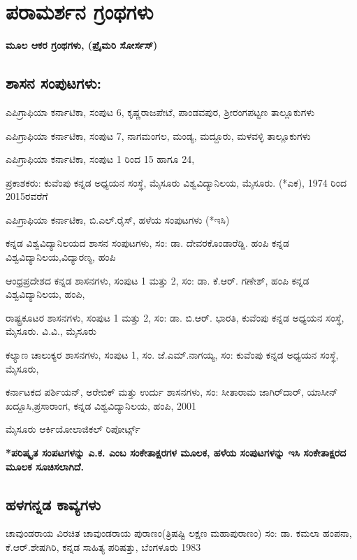 
\chapter*{ಪರಾಮರ್ಶನ ಗ್ರಂಥಗಳು}

\begin{center}
\textbf{ಮೂಲ ಆಕರ ಗ್ರಂಥಗಳು, (ಪ್ರೈಮರಿ ಸೋರ್ಸಸ್​)}
\end{center}


\section{ಶಾಸನ ಸಂಪುಟಗಳು:}

\noindent
ಎಪಿಗ್ರಾಫಿಯಾ ಕರ್ನಾಟಿಕಾ, ಸಂಪುಟ 6, ಕೃಷ್ಣರಾಜಪೇಟೆ, ಪಾಂಡವಪುರ, ಶ‍್ರೀರಂಗಪಟ್ಟಣ ತಾಲ್ಲೂಕುಗಳು 

\noindent
ಎಪಿಗ್ರಾಫಿಯಾ ಕರ್ನಾಟಿಕಾ, ಸಂಪುಟ 7, ನಾಗಮಂಗಲ, ಮಂಡ್ಯ, ಮದ್ದೂರು, ಮಳವಳ್ಳಿ ತಾಲ್ಲೂಕುಗಳು

\noindent
ಎಪಿಗ್ರಾಫಿಯಾ ಕರ್ನಾಟಿಕಾ, ಸಂಪುಟ 1 ರಿಂದ 15 ಹಾಗೂ 24, 

\noindent
ಪ್ರಕಾಶಕರು: ಕುವೆಂಪು ಕನ್ನಡ ಅಧ್ಯಯನ ಸಂಸ್ಥೆ, ಮೈಸೂರು ವಿಶ್ವವಿದ್ಯಾನಿಲಯ, ಮೈಸೂರು. (*ಎಕ), 1974 ರಿಂದ 2015ರವರೆಗೆ

\noindent
ಎಪಿಗ್ರಾಫಿಯಾ ಕರ್ನಾಟಿಕಾ, ಬಿ.ಎಲ್​.ರೈಸ್​, ಹಳೆಯ ಸಂಪುಟಗಳು (*ಇಸಿ)

\noindent
ಕನ್ನಡ ವಿಶ್ವವಿದ್ಯಾನಿಲಯದ ಶಾಸನ ಸಂಪುಟಗಳು, ಸಂ: ಡಾ. ದೇವರಕೊಂಡಾರೆಡ್ಡಿ. ಹಂಪಿ ಕನ್ನಡ ವಿಶ್ವವಿದ್ಯಾನಿಲಯ,\break ವಿದ್ಯಾರಣ್ಯ, ಹಂಪಿ

\noindent
ಆಂಧ್ರಪ್ರದೇಶದ ಕನ್ನಡ ಶಾಸನಗಳು, ಸಂಪುಟ 1 ಮತ್ತು 2, ಸಂ: ಡಾ. ಕೆ.ಆರ್​. ಗಣೇಶ್​, ಹಂಪಿ ಕನ್ನಡ ವಿಶ್ವವಿದ್ಯಾನಿಲಯ, ಹಂಪಿ,

\noindent
ರಾಷ್ಟ್ರಕೂಟರ ಶಾಸನಗಳು, ಸಂಪುಟ 1 ಮತ್ತು 2, ಸಂ: ಡಾ. ಬಿ.ಆರ್​. ಭಾರತಿ, ಕುವೆಂಪು ಕನ್ನಡ ಅಧ್ಯಯನ ಸಂಸ್ಥೆ, ಮೈಸೂರು. ವಿ.ವಿ., ಮೈಸೂರು

\noindent
ಕಲ್ಯಾಣ ಚಾಲುಕ್ಯರ ಶಾಸನಗಳು, ಸಂಪುಟ 1, ಸಂ. ಜೆ.ಎಮ್.ನಾಗಯ್ಯ, ಸಂ: ಕುವೆಂಪು ಕನ್ನಡ ಅಧ್ಯಯನ ಸಂಸ್ಥೆ, ಮೈಸೂರು,

\noindent
ಕರ್ನಾಟಕದ ಪರ್ಶಿಯನ್​, ಅರೇಬಿಕ್​ ಮತ್ತು ಉರ್ದು ಶಾಸನಗಳು, ಸಂ: ಸೀತಾರಾಮ ಜಾಗಿರ್​ದಾರ್​, ಯಾಸೀನ್​\break ಖದ್ದೂಸಿ,ಪ್ರಸಾರಾಂಗ, ಕನ್ನಡ ವಿಶ್ವವಿದ್ಯಾನಿಲಯ, ಹಂಪಿ, 2001

\noindent
ಮೈಸೂರು ಆರ್ಕಿಯೋಲಾಜಿಕಲ್​ ರಿಪೋರ್ಟ್ಸ್

\noindent
\textbf{*ಪರಿಷ್ಕೃತ ಸಂಪಟಗಳನ್ನು ಎ.ಕ. ಎಂಬ ಸಂಕೇತಾಕ್ಷರಗಳ ಮೂಲಕ, ಹಳೆಯ ಸಂಪುಟಗಳನ್ನು ಇಸಿ ಸಂಕೇತಾಕ್ಷರದ ಮೂಲಕ ಸೂಚಿಸಲಾಗಿದೆ.}


\section{ಹಳಗನ್ನಡ ಕಾವ್ಯಗಳು}

\noindent
ಚಾವುಂಡರಾಯ ವಿರಚಿತ ಚಾವುಂಡರಾಯ ಪುರಾಣಂ(ತ್ರಿಷಷ್ಟಿ ಲಕ್ಷಣ ಮಹಾಪುರಾಣಂ) ಸಂ: ಡಾ. ಕಮಲಾ ಹಂಪನಾ, ಕೆ.ಆರ್​.ಶೇಷಗಿರಿ, ಕನ್ನಡ ಸಾಹಿತ್ಯ ಪರಿಷತ್ತು, ಬೆಂಗಳೂರು 1983

